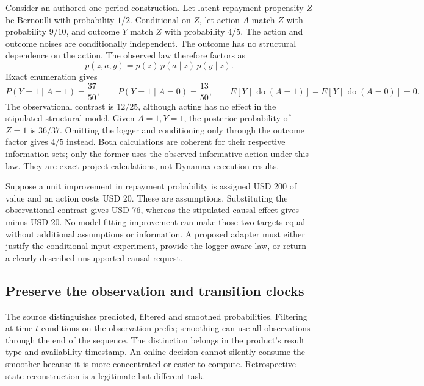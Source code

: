 Consider an authored one-period construction. Let latent repayment propensity
$Z$ be Bernoulli with probability $1/2$. Conditional on $Z$, let action $A$
match $Z$ with probability $9/10$, and outcome $Y$ match $Z$ with probability
$4/5$. The action and outcome noises are conditionally independent. The outcome
has no structural dependence on the action. The observed law therefore factors as
\begin{equation}
 p(z,a,y)=p(z)\,p(a\mid z)\,p(y\mid z).
 \label{exec19:dynamax-law}
\end{equation}
Exact enumeration gives
\begin{equation}
 P(Y=1\mid A=1)=\frac{37}{50},\qquad
 P(Y=1\mid A=0)=\frac{13}{50},\qquad
 E[Y\mid\operatorname{do}(A=1)]-E[Y\mid\operatorname{do}(A=0)]=0.
 \label{exec19:dynamax-contrast}
\end{equation}
The observational contrast is $12/25$, although acting has no effect in the
stipulated structural model. Given $A=1,Y=1$, the posterior probability of
$Z=1$ is $36/37$. Omitting the logger and conditioning only through the outcome
factor gives $4/5$ instead. Both calculations are coherent for their respective
information sets; only the former uses the observed informative action under
this law. They are exact project calculations, not Dynamax execution results.
\citep{exec19_dynamax_reference}

Suppose a unit improvement in repayment probability is assigned USD 200 of
value and an action costs USD 20. These are assumptions. Substituting the
observational contrast gives USD 76, whereas the stipulated causal effect gives
minus USD 20. No model-fitting improvement can make those two targets equal
without additional assumptions or information. A proposed adapter must either
justify the conditional-input experiment, provide the logger-aware law, or
return a clearly described unsupported causal request.\citep{exec19_dynamax_reference}

\subsection{Preserve the observation and transition clocks}
\label{exec19:dynamax-clocks}

The source distinguishes predicted, filtered and smoothed probabilities.
Filtering at time $t$ conditions on the observation prefix; smoothing can use
all observations through the end of the sequence. The distinction belongs in
the product's result type and availability timestamp. An online decision cannot
silently consume the smoother because it is more concentrated or easier to
compute. Retrospective state reconstruction is a legitimate but different task.
\citep{exec19_dynamax_source}

